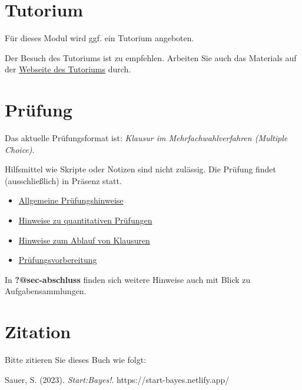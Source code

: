 \documentclass[
  ngerman,
  letterpaper,
]{scrbook}
\providecommand{\tightlist}{%
  \setlength{\itemsep}{0pt}\setlength{\parskip}{0pt}}
\begin{document}
\section{Tutorium}\label{tutorium}

Für dieses Modul wird ggf. ein Tutorium angeboten.

Der Besuch des Tutoriums ist zu empfehlen. Arbeiten Sie auch das
Materials auf der \href{https://qm2-tutorium.netlify.app/}{Webseite des
Tutoriums} durch.

\section{Prüfung}\label{pruxfcfung}

Das aktuelle Prüfungsformat ist: \emph{Klausur im Mehrfachwahlverfahren
(Multiple Choice)}.

Hilfsmittel wie Skripte oder Notizen sind nicht zulässig. Die Prüfung
findet (ausschließlich) in Präsenz statt.

\begin{itemize}
\tightlist
\item
  \href{https://hinweisbuch.netlify.app/010-hinweise-pruefung-allgemein-frame}{Allgemeine
  Prüfungshinweise}
\end{itemize}

\begin{itemize}
\item
  \href{https://hinweisbuch.netlify.app/030-hinweise-pruefung-klausur-frame}{Hinweise
  zu quantitativen Prüfungen}
\item
  \href{https://hinweisbuch.netlify.app/030-hinweise-pruefung-klausur-frame\#ablauf-einer-pr\%C3\%BCfung}{Hinweise
  zum Ablauf von Klausuren}
\item
  \href{https://hinweisbuch.netlify.app/150-hinweise-pruefungsvorbereitung-frame}{Prüfungsvorbereitung}
\end{itemize}

In \textbf{?@sec-abschluss} finden sich weitere Hinweise auch mit Blick
zu Aufgabensammlungen.

\section{Zitation}\label{zitation}

Bitte zitieren Sie dieses Buch wie folgt:

\begin{displayquote}
Sauer, S. (2023). \emph{Start:Bayes!}. https://start-bayes.netlify.app/
\end{displayquote}
\end{document}
